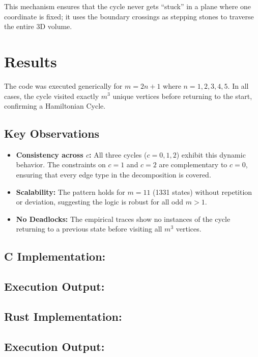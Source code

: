 \documentclass[10pt, letterpaper]{article}
\begin{document}
This mechanism ensures that the cycle never gets ``stuck'' in a plane where one coordinate is fixed; it uses the boundary crossings as stepping stones to traverse the entire 3D volume.

\section{Results}

The code was executed generically for $m = 2n + 1$ where $n = 1, 2, 3, 4, 5$. In all cases, the cycle visited exactly $m^3$ unique vertices before returning to the start, confirming a Hamiltonian Cycle.

\subsection{Key Observations}
\begin{itemize}
    \item \textbf{Consistency across $c$:} All three cycles ($c=0, 1, 2$) exhibit this dynamic behavior. The constraints on $c=1$ and $c=2$ are complementary to $c=0$, ensuring that every edge type in the decomposition is covered.
    \item \textbf{Scalability:} The pattern holds for $m=11$ (1331 states) without repetition or deviation, suggesting the logic is robust for all odd $m > 1$.
    \item \textbf{No Deadlocks:} The empirical traces show no instances of the cycle returning to a previous state before visiting all $m^3$ vertices.
\end{itemize}

\subsection{C Implementation:} 

\subsection{Execution Output:} 

\subsection{Rust Implementation:} 

\subsection{Execution Output:} 
\end{document}
